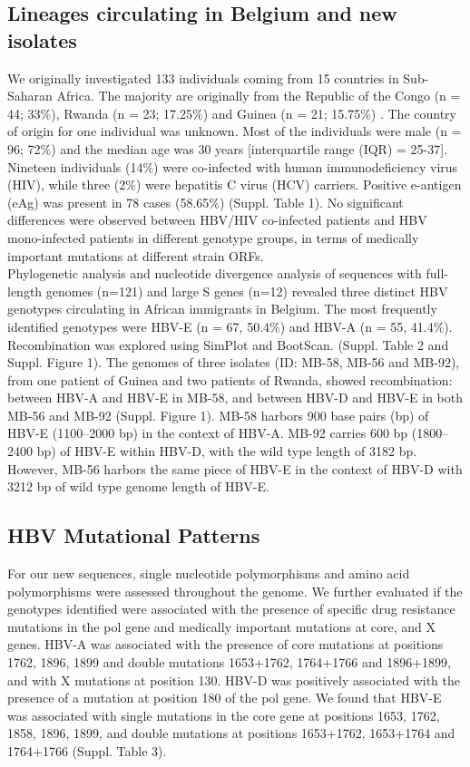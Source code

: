 \subsection{Lineages circulating in Belgium and new isolates}
We originally investigated 133 individuals coming from 15 countries in Sub-Saharan Africa. The majority are originally from the Republic of the Congo (n = 44; 33\%), Rwanda (n = 23; 17.25\%) and Guinea (n = 21; 15.75\%) . The country of origin for one individual was unknown. Most of the individuals were male (n = 96; 72\%) and the median age was 30 years [interquartile range (IQR) = 25-37]. Nineteen individuals (14\%) were co-infected with human immunodeficiency virus (HIV), while three (2\%) were hepatitis C virus (HCV) carriers. Positive e-antigen (eAg) was present in 78 cases (58.65\%) (Suppl. Table 1). No significant differences were observed between HBV/HIV co-infected patients and HBV mono-infected patients in different genotype groups, in terms of medically important mutations at different strain ORFs.\\

Phylogenetic analysis and nucleotide divergence analysis of sequences with full-length genomes (n=121) and large S genes (n=12) revealed three distinct HBV genotypes circulating in African immigrants in Belgium. The most frequently identified genotypes were HBV-E (n = 67, 50.4\%) and HBV-A (n = 55, 41.4\%).  Recombination was explored using SimPlot and BootScan. (Suppl. Table 2 and  Suppl. Figure 1). The genomes of three isolates (ID: MB-58, MB-56 and MB-92), from one patient of Guinea and two patients of Rwanda, showed recombination: between HBV-A and HBV-E in MB-58, and between HBV-D and HBV-E in both MB-56 and MB-92 (Suppl. Figure 1). MB-58 harbors 900 base pairs (bp) of HBV-E (1100--2000 bp) in the context of HBV-A. MB-92 carries 600 bp (1800--2400 bp) of HBV-E within HBV-D, with the wild type length of 3182 bp. However, MB-56 harbors the same piece of HBV-E in the context of HBV-D with 3212 bp of wild type genome length of HBV-E. 

\subsection{HBV Mutational Patterns}
For our new sequences, single nucleotide polymorphisms and amino acid polymorphisms were assessed throughout the genome. We further evaluated if the genotypes identified were associated with the presence of specific drug resistance mutations in the pol gene and medically important mutations at core, and X genes. HBV-A was associated with the presence of core mutations at positions 1762, 1896, 1899 and double mutations 1653+1762, 1764+1766 and 1896+1899, and with X mutations at position 130. HBV-D was positively associated with the presence of a mutation at position 180 of the pol gene. We found that HBV-E was associated with single mutations in the core gene at positions 1653, 1762, 1858, 1896, 1899, and double mutations at positions 1653+1762, 1653+1764 and 1764+1766 (Suppl. Table 3).\\


